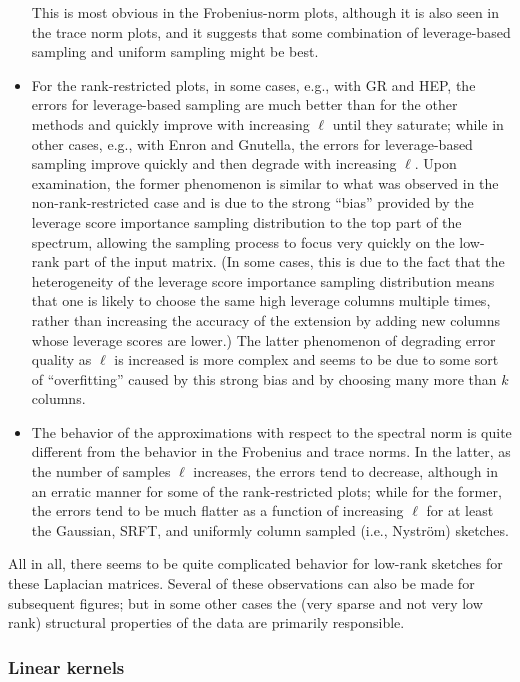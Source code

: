 \begin{itemize}
This is most obvious in the Frobenius-norm plots, although it is also seen in
the trace norm plots, and it suggests that some combination of leverage-based
sampling and uniform sampling might be best.
\item
For the rank-restricted plots, in some cases, e.g., with GR and HEP, 
the errors for leverage-based sampling are much better than for the other 
methods and quickly improve with increasing $\ell$ until they saturate; 
while in other cases, e.g., with Enron and Gnutella, the errors for
leverage-based sampling improve quickly and then degrade with increasing 
$\ell$.
Upon examination, the former phenomenon is similar to what was observed in 
the non-rank-restricted case and is due to the strong ``bias'' provided by 
the leverage score importance sampling distribution to the top part of the 
spectrum, allowing the sampling process to focus very quickly on the 
low-rank part of the input matrix.
(In some cases, this is due to the fact that the heterogeneity of 
the leverage score importance sampling distribution means that one is likely 
to choose the same high leverage columns multiple times, rather than 
increasing the accuracy of the extension by adding new columns whose 
leverage scores are lower.) 
The latter phenomenon of degrading error quality as $\ell$ is increased is 
more complex and seems to be due to some sort of ``overfitting'' caused by 
this strong bias and by choosing many more than $k$ columns.  
\item
The behavior of the approximations with respect to the spectral norm is 
quite different from the behavior in the Frobenius and trace norms. 
In the latter, as the number of samples $\ell$ increases, the errors tend to 
decrease, although in an erratic manner for some of the rank-restricted 
plots; while for the former, the errors tend to be much flatter as a function 
of increasing $\ell$ for at least the Gaussian, SRFT, and uniformly column sampled (i.e., Nystr\"om)
sketches.
\end{itemize}
All in all, there seems to be quite complicated behavior for low-rank 
sketches for these Laplacian matrices.
Several of these observations can also be made for subsequent figures; but
in some other cases the (very sparse and not very low rank) structural 
properties of the data are primarily responsible.

\subsubsection{Linear kernels}

